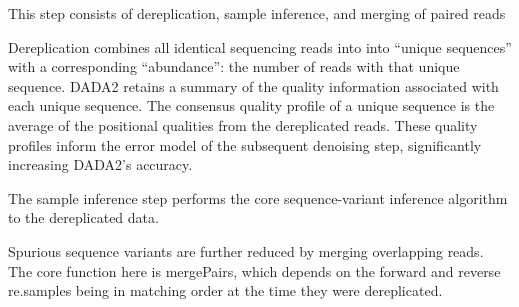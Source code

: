 \documentclass[
]{article}
\begin{document}
This step consists of dereplication, sample inference, and merging of
paired reads

Dereplication combines all identical sequencing reads into into ``unique
sequences'' with a corresponding ``abundance'': the number of reads with
that unique sequence. DADA2 retains a summary of the quality information
associated with each unique sequence. The consensus quality profile of a
unique sequence is the average of the positional qualities from the
dereplicated reads. These quality profiles inform the error model of the
subsequent denoising step, significantly increasing DADA2's accuracy.

The sample inference step performs the core sequence-variant inference
algorithm to the dereplicated data.

Spurious sequence variants are further reduced by merging overlapping
reads. The core function here is mergePairs, which depends on the
forward and reverse re.samples being in matching order at the time they
were dereplicated.
\end{document}
